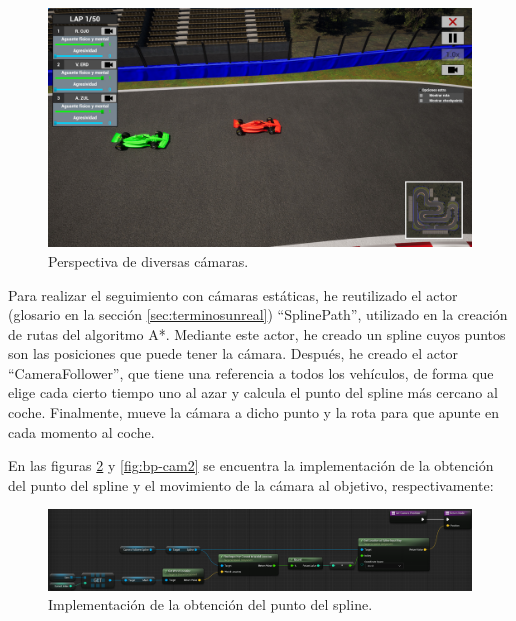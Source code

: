 \begin{figure}[H]
    \centering
    \includegraphics[width=\textwidth]{imagenes/camera/cam-pers.jpg}
    \caption{Perspectiva de diversas cámaras.}
    \label{fig:cam-estaticas}
\end{figure}

Para realizar el seguimiento con cámaras estáticas, he reutilizado el actor (glosario en la sección \ref{sec:terminosunreal}) ``SplinePath'', utilizado en la creación de rutas del algoritmo A*. Mediante este actor, he creado un spline cuyos puntos son las posiciones que puede tener la cámara. Después, he creado el actor ``CameraFollower'', que tiene una referencia a todos los vehículos, de forma que elige cada cierto tiempo uno al azar y calcula el punto del spline más cercano al coche. Finalmente, mueve la cámara a dicho punto y la rota para que apunte en cada momento al coche.

\bigskip

En las figuras \ref{fig:bp-cam1} y \ref{fig:bp-cam2} se encuentra la implementación de la obtención del punto del spline y el movimiento de la cámara al objetivo, respectivamente:

\begin{figure}[H]
    \centering
    \includegraphics[width=\textwidth]{imagenes/blueprints/CameraFollower.getCameraPosition.png}
    \caption{Implementación de la obtención del punto del spline.}
    \label{fig:bp-cam1}
\end{figure}

